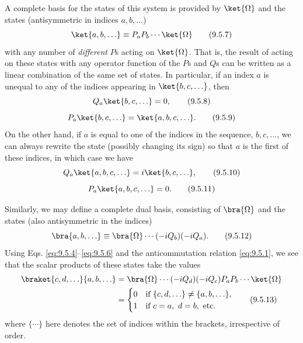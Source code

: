 A complete basis for the states of this system is provided by $\ket{\Omega}$
and the states (antisymmetric in indices $a,b,\ldots$)
\begin{equation}
\ket{a,b,\ldots}\equiv P_aP_b\cdots\ket{\Omega}
\tag{9.5.7}\label{eq:9.5.7}
\end{equation}
with any number of \emph{different} $P$s acting on $\ket{\Omega}$. That is, the
result of acting on these states with any operator function of the $P$s and
$Q$s can be written as a linear combination of the same set of states. In
particular, if an index $a$ is unequal to any of the indices appearing in
$\ket{b,c,\ldots}$, then
\begin{equation}
Q_a\ket{b,c,\ldots}=0,
\tag{9.5.8}\label{eq:9.5.8}
\end{equation}
\begin{equation}
P_a\ket{b,c,\ldots}=\ket{a,b,c,\ldots}.
\tag{9.5.9}\label{eq:9.5.9}
\end{equation}
On the other hand, if $a$ is equal to one of the indices in the sequence,
$b,c,\ldots$, we can always rewrite the state (possibly changing its sign) so
that $a$ is the first of these indices, in which case we have
\begin{equation}
Q_a\ket{a,b,c,\ldots}=i\ket{b,c,\ldots},
\tag{9.5.10}\label{eq:9.5.10}
\end{equation}
\begin{equation}
P_a\ket{a,b,c,\ldots}=0.
\tag{9.5.11}\label{eq:9.5.11}
\end{equation}

Similarly, we may define a complete dual basis, consisting of $\bra{\Omega}$
and the states (also antisymmetric in the indices)
\begin{equation}
\bra{a,b,\ldots}\equiv\bra{\Omega}\cdots(-iQ_b)(-iQ_a).
\tag{9.5.12}\label{eq:9.5.12}
\end{equation}
Using Eqs. \eqref{eq:9.5.4}--\eqref{eq:9.5.6} and the anticommutation relation \eqref{eq:9.5.1}, we see
that the scalar products of these states take the values
\begin{align}
\braket{c,d,\ldots}{a,b,\ldots}
&=\bra{\Omega}\cdots(-iQ_d)(-iQ_c)P_aP_b\cdots\ket{\Omega}\notag\\
&=\begin{cases}
0&\text{if }\{c,d,\ldots\}\ne\{a,b,\ldots\},\\
1&\text{if }c=a,\ d=b,\ \text{etc.}
\end{cases}
\tag{9.5.13}\label{eq:9.5.13}
\end{align}
where $\{\cdots\}$ here denotes the set of indices within the brackets,
irrespective of order.

